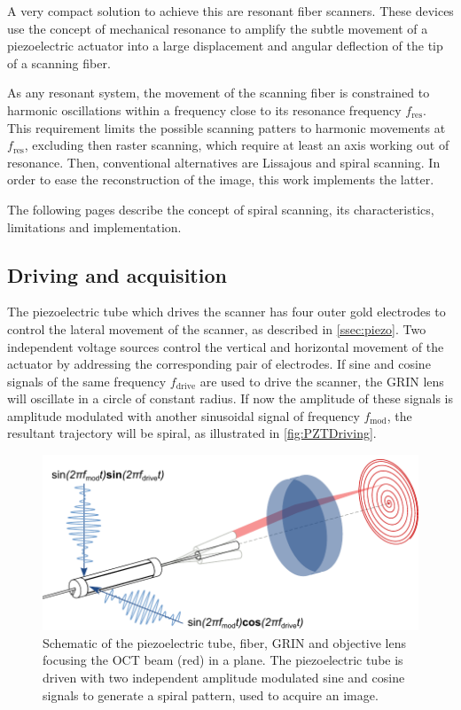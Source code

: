 \documentclass[10pt]{iopart}
\begin{document}
A very compact solution to achieve this are resonant fiber scanners. These devices use the concept of mechanical resonance to amplify the subtle movement of a piezoelectric actuator into a large displacement and angular deflection of the tip of a scanning fiber. 

As any resonant system, the movement of the scanning fiber is constrained to harmonic oscillations within a frequency close to its resonance frequency $f_\mathrm{res}$. This requirement limits the possible scanning patters to harmonic movements at $f_\mathrm{res}$, excluding then raster scanning, which require at least an axis working out of resonance. Then, conventional alternatives are Lissajous \cite{Moon2010} and spiral scanning. In order to ease the reconstruction of the image, this work implements the latter.

The following pages describe the concept of spiral scanning, its characteristics, limitations and implementation.

\subsection*{Driving and acquisition}
The piezoelectric tube which drives the scanner has four outer gold electrodes to control the lateral movement of the scanner, as described in \autoref{ssec:piezo}. Two independent voltage sources control the vertical and horizontal movement of the actuator by addressing the corresponding pair of electrodes. If sine and cosine signals of the same frequency $f_\mathrm{drive}$ are used to drive the scanner, the GRIN lens will oscillate in a circle of constant radius. If now the amplitude of these signals is amplitude modulated with another sinusoidal signal of frequency $f_\mathrm{mod}$, the resultant trajectory will be spiral, as illustrated in \autoref{fig:PZTDriving}.

\begin{figure}[h!]\centering \includegraphics[width=\columnwidth]{figures/PZTDrivingMoving.pdf}
      \caption{Schematic of the piezoelectric tube, fiber, GRIN and objective lens focusing the OCT beam (red) in a plane. 
      The piezoelectric tube is driven with two independent amplitude modulated sine and cosine signals to generate a spiral pattern, used to acquire an image. }
      \label{fig:PZTDriving}
\end{figure}
\end{document}
